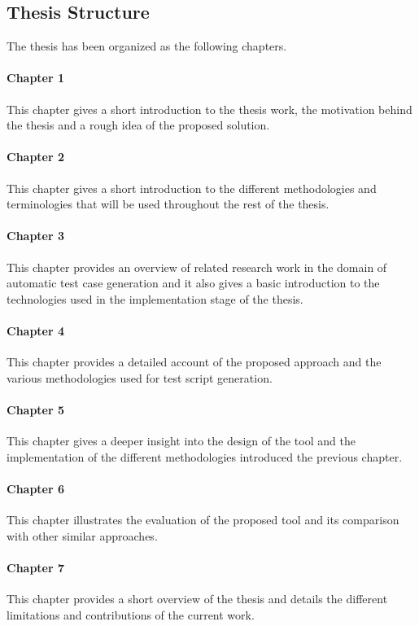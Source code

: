 \subsection{Thesis Structure}
The thesis has been organized as the following chapters.
\paragraph{Chapter 1} This chapter gives a short introduction to the thesis work, the motivation behind the thesis and a rough idea of the proposed solution.
\paragraph{Chapter 2} This chapter gives a short introduction to the different methodologies and terminologies that will be used throughout the rest of the thesis.
\paragraph{Chapter 3} This chapter provides an overview of related research work in the domain of automatic test case generation and it also gives a basic introduction to the technologies used in the implementation stage of the thesis.
\paragraph{Chapter 4} This chapter provides a detailed account of the proposed approach and the various methodologies used for test script generation.
\paragraph{Chapter 5} This chapter gives a deeper insight into the design of the tool and the implementation of the different methodologies introduced the previous chapter.
\paragraph{Chapter 6} This chapter illustrates the evaluation of the proposed tool and its comparison with other similar approaches.
\paragraph{Chapter 7} This chapter provides a short overview of the thesis and details the different limitations and contributions of the current work.